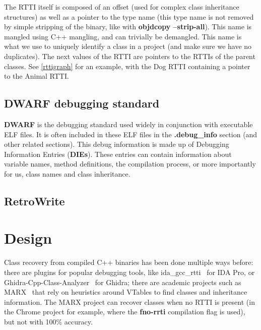 \documentclass[a4paper,11pt,oneside]{report}
\begin{document}
The RTTI itself is composed of an offset (used for complex class inheritance structures) as well as a pointer to the type name (this type name is not removed by simple stripping of the binary, like with \textbf{objdcopy --strip-all}).
This name is mangled using C++ mangling, and can trivially be demangled. This name is what we use to uniquely identify a class in a project (and make sure we have no duplicates).
The next values of the RTTI are pointers to the RTTIs of the parent classes. See \autoref{rttigraph} for an example, with the Dog RTTI containing a pointer to the Animal RTTI.

\section{DWARF debugging standard}

\textbf{DWARF} is the debugging standard used widely in conjunction with executable ELF files.
It is often included in these ELF files in the \textbf{.debug\_info} section (and other related sections).
This debug information is made up of Debugging Information Entries (\textbf{DIEs}).
These entries can contain information about variable names, method definitions, the compilation process, or more importantly for us, class names and class inheritance.


\section{RetroWrite}



\chapter{Design}



Class recovery from compiled C++ binaries has been done multiple ways before:
there are plugins for popular debugging tools, like ida\_gcc\_rtti~\cite{idagccrtti} for IDA Pro,
or Ghidra-Cpp-Class-Analyzer~\cite{ghidracppclassanalyzer} for Ghidra;
there are academic projects such as MARX~\cite{marx} that rely on heuristics around VTables to find classes and inheritance information.
The MARX project can recover classes when no RTTI is present (in the Chrome project for example, where the \textbf{fno-rrti} compilation flag is used), but not with 100\% accuracy.
\end{document}
